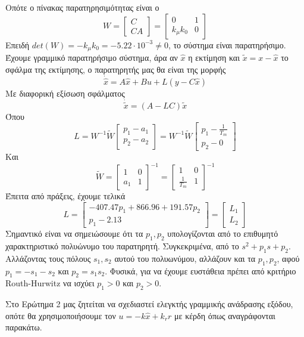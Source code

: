 Οπότε ο πίνακας παρατηρησιμότητας είναι ο
\[
    W = 
    \begin{bmatrix}
        C \\ CA
    \end{bmatrix} = 
    \begin{bmatrix}
        0 & 1 \\
        k_μk_0 & 0
    \end{bmatrix}
\]
Επειδή $det(W) = -k_μk_0 = -5.22 \cdot 10^{-3} \neq 0$, το σύστημα είναι παρατηρήσιμο. Έχουμε γραμμικό παρατηρήσιμο σύστημα, άρα αν $\hat{x}$ η εκτίμηση και $\tilde{x} = x - \hat{x}$ το σφάλμα της εκτίμησης, ο παρατηρητής μας θα είναι της μορφής
\[
    \dot{\hat{x}} = A\hat{x} + Bu + L(y-C\hat{x})
\]
Με διαφορική εξίσωση σφάλματος
\[
    \dot{\tilde{x}} = (A - LC)\tilde{x}
\]
Όπου
\[
    L = W^{-1}\tilde{W}
    \begin{bmatrix}
        p_1 - a_1 \\ p_2 - a_2
    \end{bmatrix} = 
    W^{-1}\tilde{W}
    \begin{bmatrix}
        p_1 - \frac{1}{T_m} \\ p_2 - 0
    \end{bmatrix}
\]
Και
\[
    \tilde{W} = \begin{bmatrix}
        1 & 0 \\ a_1 & 1
    \end{bmatrix}^{-1} = 
    \begin{bmatrix}
        1 & 0 \\ \frac{1}{T_m} & 1
    \end{bmatrix}^{-1}
\]
Έπειτα από πράξεις, έχουμε τελικά
\[
    L = \begin{bmatrix}
        -407.47p_1+866.96+191.57p_2 \\ p_1 - 2.13
    \end{bmatrix} = 
    \begin{bmatrix}
        L_1 \\ L_2
    \end{bmatrix}
\]
Σημαντικό είναι να σημειώσουμε ότι τα $p_1, p_2$ υπολογίζονται από το επιθυμητό χαρακτηριστικό πολυώνυμο του παρατηρητή. Συγκεκριμένα, από το $s^2 + p_1s + p_2$. Αλλάζοντας τους πόλους $s_1, s_2$ αυτού του πολυωνύμου, αλλάζουν και τα $p_1, p_2$, αφού $p_1 = -s_1 - s_2$ και $p_2 = s_1s_2$. Φυσικά, για να έχουμε ευστάθεια πρέπει από κριτήριο Routh-Hurwitz να ισχύει $p_1 > 0$ και $p_2 > 0$.

Στο Ερώτημα 2 μας ζητείται να σχεδιαστεί ελεγκτής γραμμικής ανάδρασης εξόδου, οπότε θα χρησιμοποιήσουμε τον $u=-k\hat{x} + k_rr$ με κέρδη όπως αναγράφονται παρακάτω.
